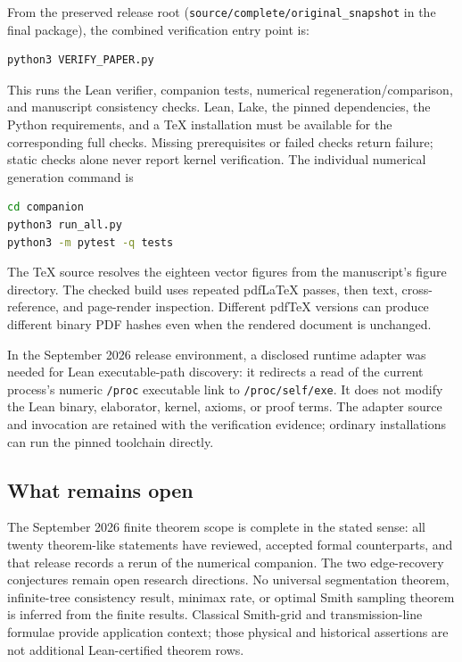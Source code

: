 \documentclass[11pt,a4paper]{article}
\theoremstyle{definition}
\theoremstyle{remark}
\begin{document}
From the preserved release root (\texttt{source/complete/original\_snapshot} in the final package), the combined verification entry point is:
\begin{lstlisting}[language=bash,numbers=none]
python3 VERIFY_PAPER.py
\end{lstlisting}
This runs the Lean verifier, companion tests, numerical regeneration/comparison, and manuscript consistency checks. Lean, Lake, the pinned dependencies, the Python requirements, and a TeX installation must be available for the corresponding full checks. Missing prerequisites or failed checks return failure; static checks alone never report kernel verification. The individual numerical generation command is
\begin{lstlisting}[language=bash,numbers=none]
cd companion
python3 run_all.py
python3 -m pytest -q tests
\end{lstlisting}
The TeX source resolves the eighteen vector figures from the manuscript's figure directory. The checked build uses repeated pdfLaTeX passes, then text, cross-reference, and page-render inspection. Different pdfTeX versions can produce different binary PDF hashes even when the rendered document is unchanged.

In the September 2026 release environment, a disclosed runtime adapter was needed for Lean executable-path discovery: it redirects a read of the current process's numeric \texttt{/proc} executable link to \texttt{/proc/self/exe}. It does not modify the Lean binary, elaborator, kernel, axioms, or proof terms. The adapter source and invocation are retained with the verification evidence; ordinary installations can run the pinned toolchain directly.

\subsection{What remains open}

The September 2026 finite theorem scope is complete in the stated sense: all twenty theorem-like statements have reviewed, accepted formal counterparts, and that release records a rerun of the numerical companion. The two edge-recovery conjectures remain open research directions. No universal segmentation theorem, infinite-tree consistency result, minimax rate, or optimal Smith sampling theorem is inferred from the finite results. Classical Smith-grid and transmission-line formulae provide application context; those physical and historical assertions are not additional Lean-certified theorem rows.
\end{document}
